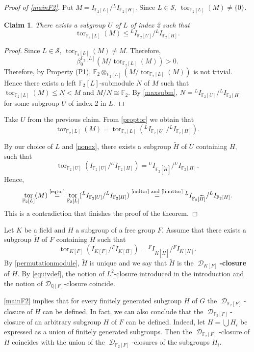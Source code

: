 \documentclass{amsart}
\newtheorem{claim}[lem]{Claim}
\theoremstyle{definition}
\theoremstyle{remark}
\DeclareMathOperator{\D}{\mathcal D}
\DeclareMathOperator{\tor}{tor}
\newcommand{\myeq}[1]{\ensuremath{\stackrel{\text{#1}}{=}}}
\newcommand{\F}{\mathbb{F}}
\begin{document}
\begin{proof}[Proof of \cref{mainF2}]
Put $M=I_{\F_2[L]}/{}^LI_{\F_2[H]}$. Since $L\in \mathcal S$, 
 $\tor_{\F_2[L]}(M)\ne \{0\}$.
  \begin{claim} \label{subgroupindex2}
There exists a  subgroup $U$ of  $L$ of  index 2 such that $$\tor_{\F_2[L]}(M)\leq {}^LI_{\F_2[U]}/{}^LI_{\F_2[H]}.$$ 
\end{claim}
\begin{proof} Since $L\in \mathcal S$, 
 $\tor_{\F_2[L]}(M)\ne M$. Therefore, $$\beta_0^{\F_2[L]}(M/\tor_{\F_2[L]}(M))>0.$$ 
Therefore, by Property (P1), $\F_2\otimes_{\F_2[L]}(M/\tor_{\F_2[L]}(M))$ is not trivial. Hence there exists  a left $\F_2[L]$-submodule $N$ of $M$ such that 
 $\tor_{\F_2[L]}(M)\leq N  <M$ and $M/N \cong \F_2$. By \cref{maxsubm}, $N ={}^LI_{\F_2[U]}/{}^LI_{\F_2[H]}$ for some subgroup $U$ of index 2 in $L$. 
\renewcommand\qedsymbol{$\diamond$}\end{proof}
Take $U$ from the previous claim. From \cref{proptor} we obtain that
\begin{equation}
\label{eqtor}
\tor_{\F_2[L]}(M)=\tor_{\F_2[L]} \left ({}^LI_{\F_2[U]}\big /{}^LI_{\F_2[H]}\right ).\end{equation}

By our choice of $L$ and \cref{nonex}, there exists a subgroup $\widetilde H$ of $U$ containing $H$, such that 
\begin{equation}\label{limittor}
\tor_{\F_2[U]}(I_{\F_2[U]}/{}^UI_{\F_2[H]})={}^UI_{\F_2[\widetilde H]}/{}^UI_{\F_2[H]}.
\end{equation}
Hence,
$$\tor_{\F_2[L]}(M)\myeq{\cref{eqtor}}\tor_{\F_2[L]}({}^LI_{\F_2[U]}/{}^LI_{\F_2[H]})\myeq{\cref{indtor} and \cref{limittor}}{}^LI_{\F_2[\widetilde H]}/{}^LI_{\F_2[H]}.$$
This is a contradiction that finishes the proof of the theorem.
\end{proof}

Let $K$ be  a field and $H$ a subgroup of a free group $F$. Assume that there exists a subgroup $\widetilde H$ of $F$ containing $H$  such that 
$$\tor_{K[F]}(I_{K[F]}/{}^FI_{K[H]})={}^FI_{K[\widetilde H]}/{}^FI_{K[H]}.$$
By \cref{permutationmodule}, $\widetilde H$ is unique and 
 we say that $\widetilde H$ is  the {\bf $\D_{K[F]}$-closure} of $H$. By \cref{equivdef}, the notion of $L^2$-closure introduced in the introduction and the notion of $\mathcal{D}_{\mathbb{Q}[F]}$-closure coincide.


 
 
 \cref{mainF2} implies that for every finitely generated subgroup $H$ of $G$ the $\D_{\F_2[F]}$-closure of $H$ can be defined. 
In fact, we can also conclude that the $\D_{\F_2[F]}$-closure of an arbitrary subgroup $H$ of $F$ can be defined. Indeed, let $H = \bigcup H_i$ be expressed as a union  of finitely generated subgroups. Then the $\D_{\F_2[F]}$-closure of $H$ coincides with the union of the $\D_{\F_2[F]}$-closures of the subgroups $H_i$.
\end{document}
